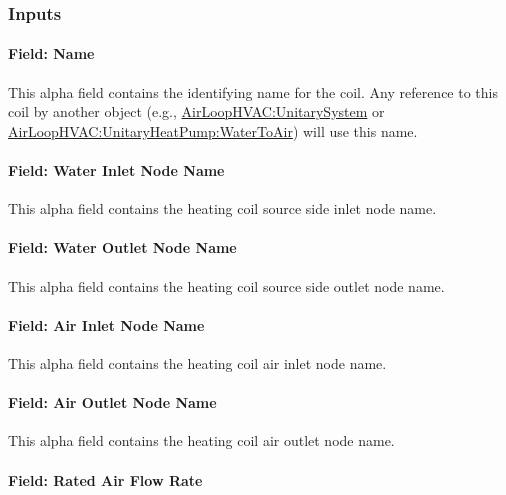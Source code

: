 \subsubsection{Inputs}\label{inputs-33}

\paragraph{Field: Name}\label{field-name-32}

This alpha field contains the identifying name for the coil. Any reference to this coil by another object (e.g., \hyperref[airloophvacunitarysystem]{AirLoopHVAC:UnitarySystem} or \hyperref[airloophvacunitaryheatpumpwatertoair]{AirLoopHVAC:UnitaryHeatPump:WaterToAir}) will use this name.

\paragraph{Field: Water Inlet Node Name}\label{field-water-inlet-node-name-9}

This alpha field contains the heating coil source side inlet node name.

\paragraph{Field: Water Outlet Node Name}\label{field-water-outlet-node-name-9}

This alpha field contains the heating coil source side outlet node name.

\paragraph{Field: Air Inlet Node Name}\label{field-air-inlet-node-name-20}

This alpha field contains the heating coil air inlet node name.

\paragraph{Field: Air Outlet Node Name}\label{field-air-outlet-node-name-20}

This alpha field contains the heating coil air outlet node name.

\paragraph{Field: Rated Air Flow Rate}\label{field-rated-air-flow-rate-6}

